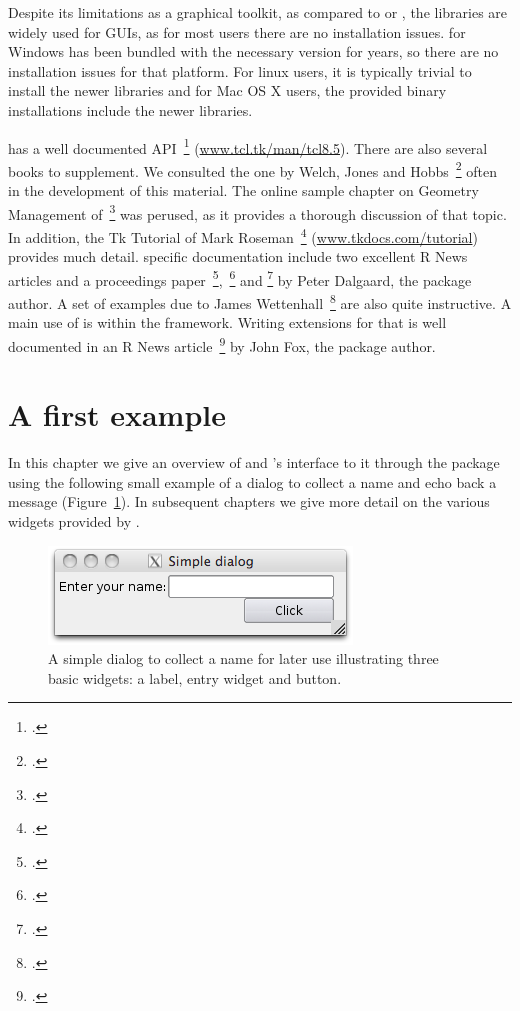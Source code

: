 Despite its limitations as a graphical toolkit, as compared to \GTK\/
or \Qt, the \TK\/ libraries are widely used for \R\/ GUIs, as for most
users there are no installation issues. \R\/ for Windows has been
bundled with the necessary \TK\/ version for years, so there are no
installation issues for that platform. For linux users, it is
typically trivial to install the newer libraries and for Mac OS X
users, the provided binary installations include the newer \TK\/
libraries.

\Tk{} has a well documented API~\footcite{TclTk:Api}
(\url{www.tcl.tk/man/tcl8.5}).  There are also several books to
supplement. We consulted the one by Welch, Jones and
Hobbs~\footcite{beedub} often in the development of this
material. The online sample chapter on Geometry Management
of~\footcite{Walsh} was perused, as it provides a thorough discussion
of that topic. In addition, the Tk Tutorial of Mark
Roseman~\footcite{TclTk:Tutorial} (\url{www.tkdocs.com/tutorial})
provides much detail. \R{} specific documentation include two
excellent R News articles and a proceedings
paper~\footcite{Rnews:Dalgaard:2001a},~\footcite{Rnews:Dalgaard:2002}
and \footcite{Dalgaard-DSC} by Peter Dalgaard, the package author. A
set of examples due to James Wettenhall~\footcite{Wettenhall} are also
quite instructive. A main use of  is within the 
framework. Writing extensions for that is well documented in an R News
article~\footcite{Rnews:Fox:2007} by John Fox, the package author.
 

\section{A first example}
\label{sec:first-example}

In this chapter we give an overview of \Tk\/ and \R's interface to it
through the  package using the following small example of a
dialog to collect a name and echo back a message
(Figure~\ref{fig:tcltk-simple-dialog}). In subsequent chapters we give
more detail on the various widgets provided by \Tk.

\begin{figure}
  \centering
  \includegraphics[width=.6\textwidth]{fig-tcltk-themed-dialog.png}
  \caption{A simple dialog to collect a name for later use
    illustrating three basic widgets: a label, entry widget and
    button.}
  \label{fig:tcltk-simple-dialog}
\end{figure}



